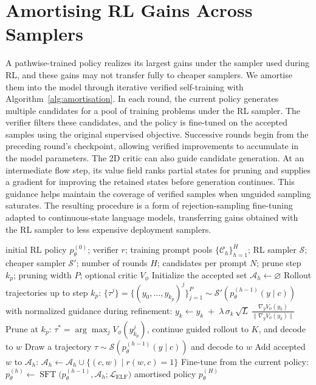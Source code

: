 \section{Amortising RL Gains Across Samplers}
\label{sec:loop}
A pathwise-trained policy realizes its largest gains under the sampler used during RL, and these gains may not transfer fully to cheaper samplers. We amortise them into the model through iterative verified self-training with Algorithm~\ref{alg:amortisation}. In each round, the current policy generates multiple candidates for a pool of training problems under the RL sampler. The verifier filters these candidates, and the policy is fine-tuned on the accepted samples using the original supervised objective. Successive rounds begin from the preceding round's checkpoint, allowing verified improvements to accumulate in the model parameters. The 2D critic can also guide candidate generation. At an intermediate flow step, its value field ranks partial states for pruning and supplies a gradient for improving the retained states before generation continues. This guidance helps maintain the coverage of verified samples when unguided sampling saturates. The resulting procedure is a form of rejection-sampling fine-tuning \citep{yuan2023rft,singh2023restem,zelikman2022star} adapted to continuous-state language models, transferring gains obtained with the RL sampler to less expensive deployment samplers.

\begin{algorithm}[t]
\caption{Amortising an RL policy by verified self-training}
\label{alg:amortisation}
\small
\begin{algorithmic}[1]
\REQUIRE initial RL policy $p_\theta^{(0)}$; verifier $r$; training prompt pools $\{\mathcal C_h\}_{h=1}^H$; RL sampler $\mathcal S$; cheaper sampler $\mathcal S'$; number of rounds $H$; candidates per prompt $N$; prune step $k_p$; pruning width $P$; optional critic $V_\phi$
  \STATE Initialize the accepted set $\mathcal A_h\leftarrow\varnothing$
        \STATE Rollout trajectories up to step $k_p$: $\{\tau^j\}=\{(y_0, \dots, y_{k_p})^j\}_{j=1}^P \sim \mathcal S'(p_{\theta}^{(h-1)}(y\mid c))$ with normalized guidance during refinement: $y_{k} \leftarrow y_{k} \;+\; \lambda\,\sigma_{k}\,\sqrt{L}\,\frac{\nabla_{y}V_\phi(y_{k})}{\bigl\lVert\nabla_{y}V_\phi(y_{k})\bigr\rVert}$
        \STATE Prune at $k_p$: $\tau^*=\arg\max_j V_\phi(y^j_{k_p})$,  continue guided rollout to $K$, and decode to $w$
      \ELSE
        \STATE Draw a trajectory $\tau\sim \mathcal S(p_{\theta}^{(h-1)}(y\mid c))$ and decode to $w$
      \ENDIF
      \STATE Add accepted $w$ to $\mathcal A_h$: $\mathcal A_h \leftarrow \mathcal A_h \cup \{(c, w) \mid r(w,c)=1\}$
    \ENDFOR
  \ENDFOR
  \STATE Fine-tune from the current policy: $
    p_{\theta}^{(h)}
    \leftarrow
    \operatorname{SFT}
    \bigl(p_{\theta}^{(h-1)},\mathcal A_h; \mathcal L_{\mathrm{ELF}} \bigr)$
\ENDFOR
\RETURN amortised policy $p_\theta^{(H)}$
\end{algorithmic}
\end{algorithm}